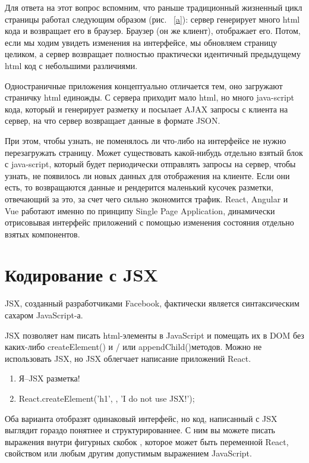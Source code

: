 \documentclass[a4paper,12pt]{diplom}
\begin{document}
Для ответа на этот вопрос вспомним, что раньше традиционный жизненный цикл страницы работал следующим образом (рис. ~\ref{a}): сервер генерирует много html кода и возвращает его в браузер. Браузер (он же клиент), отображает его. Потом, если мы ходим увидеть изменения на интерфейсе, мы обновляем страницу целиком, а сервер возвращает полностью практически идентичный предыдущему html код с небольшими различиями.

Одностраничные приложения концептуально отличается тем, оно загружают страничку html единожды. С сервера приходит мало html, но много java-script кода, который и генерирует разметку и посылает AJAX запросы с клиента на сервер, на что сервер возвращает данные в формате JSON.

При этом, чтобы узнать, не поменялось ли что-либо на интерфейсе не нужно перезагружать страницу. Может существовать какой-нибудь отдельно взятый блок с java-script, который будет периодически отправлять запросы на сервер, чтобы узнать, не появилось ли новых данных для отображения на клиенте. Если они есть, то возвращаются данные и рендерится маленький кусочек разметки, отвечающий за это, за счет чего сильно экономится трафик. React, Angular и Vue работают именно по принципу Single Page Application, динамически отрисовывая интерфейс приложений с помощью изменения состояния отдельно взятых компонентов.

\section{Кодирование с JSX}

JSX, созданный разработчиками Facebook, фактически является синтаксическим сахаром JavaScript-а.

JSX позволяет нам писать html-элементы в JavaScript и помещать их в DOM без каких-либо createElement() и / или appendChild()методов. Можно не использовать JSX, но JSX облегчает написание приложений React.
\begin{enumerate}
\item
Я--JSX разметка!

\item React.createElement('h1', {}, 'I do not use JSX!');
\end{enumerate}

Оба варианта отобразят одинаковый интерфейс, но код, написанный с JSX выглядит гораздо понятнее и структурированнее. С ним вы можете писать выражения внутри фигурных скобок {}, которое
может быть переменной React, свойством или любым другим допустимым выражением JavaScript.
\end{document}
